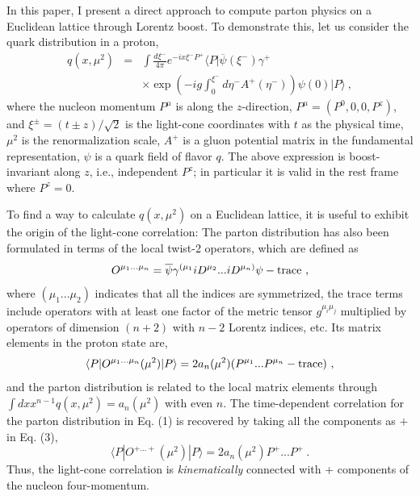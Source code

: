 \documentclass[aps,prd,preprint,tightenlines,superscriptaddress]{revtex4}
\begin{document}
In this paper, I present a direct approach to compute parton physics on a Euclidean lattice
through Lorentz boost. To demonstrate
this, let us consider the quark distribution in a proton,
\begin{eqnarray}
   q(x, \mu^2) &=& \int \frac{d\xi^-}{4\pi} e^{-ix\xi^-P^+}  \langle P|\overline{\psi}(\xi^-)
   \gamma^+ \\
   && \times \exp\left(-ig\int^{\xi^-}_0 d\eta^- A^+(\eta^-) \right)\psi(0) |P\rangle \nonumber \ ,
\end{eqnarray}
where the nucleon momentum $P^\mu$ is along the $z$-direction, $P^\mu = (P^0, 0, 0, P^z)$, and $\xi^\pm
=(t \pm z)/\sqrt{2}$ is the light-cone coordinates with $t$ as the physical time, $\mu^2$ is the renormalization scale, $A^+$
is a gluon potential matrix in the fundamental representation, $\psi$ is a quark field of flavor $q$. The
above expression is boost-invariant along $z$, i.e., independent $P^z$; in particular it is valid in the rest frame
where $P^z=0$.

To find a way to calculate $q(x,\mu^2)$ on a Euclidean lattice, it is useful to
exhibit the origin of the light-cone correlation: The parton distribution has also been formulated in terms of
the local twist-2 operators, which are defined as
\begin{equation}
     O^{\mu_1...\mu_n}= {\overline \psi}\gamma^{(\mu_1}iD^{\mu_2} ... iD^{\mu_n)} \psi
                 - {\rm trace} \ ,
\end{equation}
where $(\mu_1...\mu_2)$ indicates that all the indices are symmetrized, the trace terms include
operators with at least one factor of the metric tensor $g^{\mu_i \mu_j}$ multiplied by
operators of dimension $(n+2)$ with $n-2$ Lorentz indices, etc. Its matrix elements in the proton state
are,
\begin{equation}
    \langle P|O^{\mu_1...\mu_n}(\mu^2)|P\rangle =
    2a_n(\mu^2) (P^{\mu_1} ... P^{\mu_n} - {\rm trace}) \ ,
\end{equation}
and the parton distribution is related to the local matrix elements through $\int dx x^{n-1} q(x, \mu^2)
= a_n(\mu^2)$ with even $n$. The time-dependent correlation for the parton distribution
in Eq. (1) is recovered by taking all the
components as $+$ in Eq. (3),
\begin{equation}
   \langle P|O^{+...+}(\mu^2)|P\rangle =2 a_n(\mu^2) P^+...P^+ \ .
\end{equation}
Thus, the light-cone correlation is {\it kinematically} connected with
+ components of the nucleon four-momentum.
\end{document}
